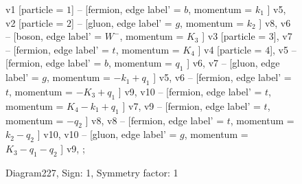 \documentclass{revtex4}
\begin{document}
\begin{figure}[!htb]
\begin{center}
{    %
v1 [particle = \(1\)] -- [fermion, edge label' = \(b\), momentum = \(k_{1}\) ] v5, 
v2 [particle = \(2\)] -- [gluon, edge label' = \(g\), momentum = \(k_{2}\) ] v8, 
v6 -- [boson, edge label' = \(W^{-}\), momentum = \(K_{3}\) ] v3 [particle = \(3\)], 
v7 -- [fermion, edge label' = \(t\), momentum = \(K_{4}\) ] v4 [particle = \(4\)], 
v5 -- [fermion, edge label' = \(b\), momentum = \(q_{1}\) ] v6, 
v7 -- [gluon, edge label' = \(g\), momentum = \(-k_{1} + q_{1}\) ] v5, 
v6 -- [fermion, edge label' = \(t\), momentum = \(-K_{3} + q_{1}\) ] v9, 
v10 -- [fermion, edge label' = \(t\), momentum = \(K_{4} - k_{1} + q_{1}\) ] v7, 
v9 -- [fermion, edge label' = \(t\), momentum = \(-q_{2}\) ] v8, 
v8 -- [fermion, edge label' = \(t\), momentum = \(k_{2} - q_{2}\) ] v10, 
v10 -- [gluon, edge label' = \(g\), momentum = \(K_{3} - q_{1} - q_{2}\) ] v9, 
};
\end{center}
\caption{Diagram227, Sign: 1, Symmetry factor: 1}
\end{figure}
\newpage
\end{document}
